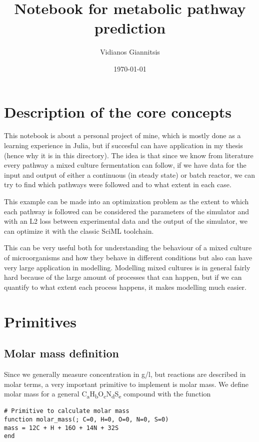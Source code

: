 \documentclass[11pt]{article}
\author{Vidianos Giannitsis}
\date{\today}
\title{Notebook for metabolic pathway prediction}
\begin{document}
\maketitle
\tableofcontents


\section{Description of the core concepts}
\label{sec:org352c375}
This notebook is about a personal project of mine, which is mostly done as a learning experience in Julia, but if succesful can have application in my thesis (hence why it is in this directory). The idea is that since we know from literature every pathway a mixed culture fermentation can follow, if we have data for the input and output of either a continuous (in steady state) or batch reactor, we can try to find which pathways were followed and to what extent in each case.

This example can be made into an optimization problem as the extent to which each pathway is followed can be considered the parameters of the simulator and with an L2 loss between experimental data and the output of the simulator, we can optimize it with the classic SciML toolchain.

This can be very useful both for understanding the behaviour of a mixed culture of microorganisms and how they behave in different conditions but also can have very large application in modelling. Modelling mixed cultures is in general fairly hard because of the large amount of processes that can happen, but if we can quantify to what extent each process happens, it makes modelling much easier.

\section{Primitives}
\label{sec:orgb127b40}
\subsection{Molar mass definition}
\label{sec:org8050d27}
Since we generally measure concentration in g/l, but reactions are described in molar terms, a very important primitive to implement is molar mass. We define molar mass for a general C\textsubscript{a}H\textsubscript{b}O\textsubscript{c}N\textsubscript{d}S\textsubscript{e} compound with the function

\begin{verbatim}
# Primitive to calculate molar mass
function molar_mass(; C=0, H=0, O=0, N=0, S=0)
mass = 12C + H + 16O + 14N + 32S
end

\end{verbatim}
\end{document}

